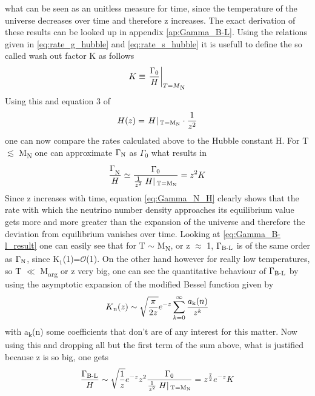 what can be seen as an unitless measure for time, since the temperature of the universe decreases over time and therefore z increases. 
The exact derivation of these results can be looked up in appendix \ref{ap:Gamma_B-L}. \newline
Using the relations given in \ref{eq:rate_g_hubble} and \ref{eq:rate_s_hubble} it is usefull to define the so called wash out factor K as follows
\begin{equation}
	K\equiv\left.\frac{\Gamma_0}{H}\right|_{T=M\textsubscript{N}}
\end{equation}
Using this and equation 3 of \cite{Buchmuller:2004nz}
\begin{equation}
	H(z)=\left.H\right|\textsubscript{T=M\textsubscript{N}}\cdot \frac{1}{z^2}
	\label{eq:H_von_z}
\end{equation}
one can now compare the rates calculated above to the Hubble constant H.\newline
For T $\lesssim$ M\textsubscript{N} one can approximate $\Gamma\textsubscript{N}$ as $\Gamma_0$ what results in 
\begin{equation}
	\frac{\Gamma_\textsubscript{N}}{H}\simeq\frac{\Gamma_0}{\frac{1}{z^2}\left.H\right|\textsubscript{T=M\textsubscript{N}}}=z^2K
	\label{eq:Gamma_N_H}
\end{equation}
Since z increases with time, equation \ref{eq:Gamma_N_H} clearly shows that the rate with which the neutrino number density approaches its equilibrium value gets more and more greater than the expansion of the universe and therefore the deviation from equilibrium vanishes over time. \newline
Looking at \ref{eq:Gamma_B-l_result} one can easily see that for T $\sim$ M\textsubscript{N}, or z $\approx$ 1, $\Gamma\textsubscript{B-L}$ is of the same order as $\Gamma\textsubscript{N}$, since K$_1$(1)=$\mathcal{O}$(1). On the other hand however for really low temperatures, so T $\ll$ M\textsubscript{arg} or z very big, one can see the quantitative behaviour of $\Gamma\textsubscript{B-L}$ by using the asymptotic expansion of the modified Bessel function given by
\begin{equation*}
	K\textsubscript{n}(z)\sim\sqrt{\frac{\pi}{2z}}e^{-z}\sum_{k=0}^{\infty}\frac{a\textsubscript{k}(n)}{z^k}
\end{equation*}
with a\textsubscript{k}(n) some coefficients that don't are of any interest for this matter. Now using this and dropping all but the first term of the sum above, what is justified because z is so big, one gets
\begin{equation}
	\frac{\Gamma\textsubscript{B-L}}{H}\sim\sqrt{\frac{1}{z}}e^{-z}z^2\frac{\Gamma_0}{\frac{1}{z^2}\left.H\right|\textsubscript{T=M\textsubscript{N}}}=z^\frac{7}{2}e^{-z}K
	\label{eq:Gamma_B-L_H}
\end{equation}
